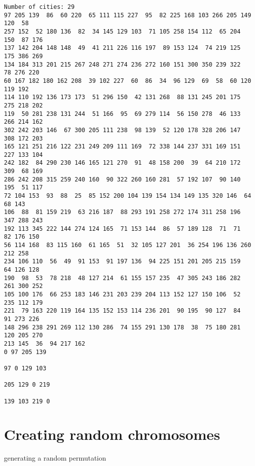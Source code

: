 \documentclass[11pt]{article}
\begin{document}
    \begin{Verbatim}[commandchars=\\\{\}]
Number of cities: 29
97 205 139  86  60 220  65 111 115 227  95  82 225 168 103 266 205 149 120  58
257 152  52 180 136  82  34 145 129 103  71 105 258 154 112  65 204 150  87 176
137 142 204 148 148  49  41 211 226 116 197  89 153 124  74 219 125 175 386 269
134 184 313 201 215 267 248 271 274 236 272 160 151 300 350 239 322  78 276 220
60 167 182 180 162 208  39 102 227  60  86  34  96 129  69  58  60 120 119 192
114 110 192 136 173 173  51 296 150  42 131 268  88 131 245 201 175 275 218 202
119  50 281 238 131 244  51 166  95  69 279 114  56 150 278  46 133 266 214 162
302 242 203 146  67 300 205 111 238  98 139  52 120 178 328 206 147 308 172 203
165 121 251 216 122 231 249 209 111 169  72 338 144 237 331 169 151 227 133 104
242 182  84 290 230 146 165 121 270  91  48 158 200  39  64 210 172 309  68 169
286 242 208 315 259 240 160  90 322 260 160 281  57 192 107  90 140 195  51 117
72 104 153  93  88  25  85 152 200 104 139 154 134 149 135 320 146  64  68 143
106  88  81 159 219  63 216 187  88 293 191 258 272 174 311 258 196 347 288 243
192 113 345 222 144 274 124 165  71 153 144  86  57 189 128  71  71  82 176 150
56 114 168  83 115 160  61 165  51  32 105 127 201  36 254 196 136 260 212 258
234 106 110  56  49  91 153  91 197 136  94 225 151 201 205 215 159  64 126 128
190  98  53  78 218  48 127 214  61 155 157 235  47 305 243 186 282 261 300 252
105 100 176  66 253 183 146 231 203 239 204 113 152 127 150 106  52 235 112 179
221  79 163 220 119 164 135 152 153 114 236 201  90 195  90 127  84  91 273 226
148 296 238 291 269 112 130 286  74 155 291 130 178  38  75 180 281 120 205 270
213 145  36  94 217 162
0 97 205 139

97 0 129 103

205 129 0 219

139 103 219 0

    \end{Verbatim}

    \hypertarget{creating-random-chromosomes}{%
\section{Creating random
chromosomes}\label{creating-random-chromosomes}}

generating a random permutation
\end{document}
